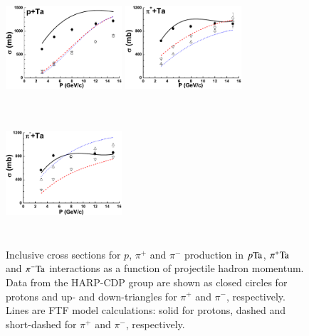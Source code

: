 \begin{figure}
\centering
\includegraphics[height=1.8in,width=1.70in]{figures/FTFfig1_1.pdf}
\includegraphics[height=1.8in,width=1.7in]{figures/FTFfig1_2.pdf}
\includegraphics[height=1.8in,width=1.7in]{figures/FTFfig1_3.pdf}
\caption{Inclusive cross sections for $p$, $\pi^+$ and $\pi^-$ production in
         $p{\rm Ta}$, $\pi^+{\rm Ta}$ and $\pi^-{\rm Ta}$ interactions as a 
         function of projectile hadron momentum.  Data from the HARP-CDP 
         group  are shown as closed circles for
         protons and up- and down-triangles for $\pi^+$ and $\pi^-$,
         respectively.  Lines are FTF model calculations: solid for protons,
         dashed and short-dashed for $\pi^+$ and $\pi^-$, respectively.}
\label{had:FTFfig1}
\end{figure}


